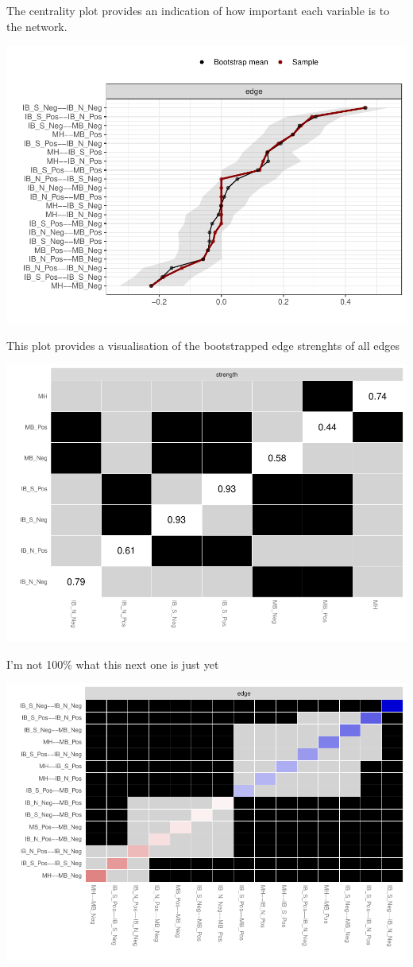 \documentclass[man,floatsintext]{apa6}
\begin{document}
The centrality plot provides an indication of how important each variable is to the network.

\includegraphics{script_files/figure-latex/edge_stability-1.pdf}

This plot provides a visualisation of the bootstrapped edge strenghts of all edges

\includegraphics{script_files/figure-latex/unnamed-chunk-7-1.pdf}

I'm not 100\% what this next one is just yet

\includegraphics{script_files/figure-latex/edge_differences-1.pdf}
\end{document}

